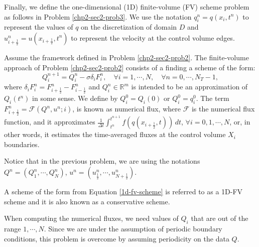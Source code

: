 Finally, we define the one-dimensional (1D) finite-volume (FV)
scheme problem as follows in Problem \ref{chp2-sec2-prob3}.
We use the notation ${q}^n_{i} = {q}(x_i, t^{n})$
to represent the values of ${q}$ on the discretization of domain $D$
and $u_{i+\frac{1}{2}}^n = u(x_{i+\frac{1}{2}},t^{n})$
to represent the velocity at the control volume edges.
\begin{prob}[1D-FV scheme]
	\label{chp2-sec2-prob3}
	Assume the framework defined in Problem \ref{chp2-sec2-prob2}.
	The finite-volume approach of Problem \ref{chp2-sec2-prob2}
	consists of a finding a scheme of the form:
        \begin{equation}
					\label{1d-fv-scheme}
		{Q}_{i}^{n+1} =  {Q}_{i}^{n} -
            \sigma \delta_i {F}_{i}^{n},
                \quad \forall i = 1, \cdots, N,
                \quad \forall n = 0, \cdots, N_T-1,
        \end{equation}
	where $\delta_i {F}_{i}^{n} = 
    {F}_{i+\frac{1}{2}}^{n} - {F}_{i-\frac{1}{2}}^{n}$
    and ${Q}_{i}^{n} \in \mathbb{R}^m$ is intended to be an approximation
	of ${Q}_i(t^{n})$ in some sense. We define by
    ${Q}_{i}^{0} = {Q}_i(0)$ or ${Q}_{i}^{0} = {q}^{0}_{i}$. 
	The term ${F}_{i+\frac{1}{2}}^{n} = \mathcal{F}
    (Q^{n}, u^n ;i)$, is known as numerical flux, where $\mathcal{F}$ 
    is the numerical flux function, and it approximates
	$\frac{1}{\Delta t}\int_{t^{n}}^{t^{n+1}} 
    {f}({q}(x_{i+\frac{1}{2}}, t)) \,dt $,
	$\forall i = 0, 1, \cdots, N$,
	or, in other words, it estimates the time-averaged fluxes at
    the control volume $X_i$ boundaries.
\end{prob}

\begin{remark}
Notice that in the previous problem, we are using the notations 
$Q^n = (Q_1^n, \cdots, Q_N^n)$, $u^n = (u_{\frac{1}{2}}^n, \cdots, u_{N+\frac{1}{2}}^n)$.
\end{remark}

\begin{remark}
	A scheme of the form from Equation \eqref{1d-fv-scheme} is referred to as a 1D-FV scheme and
	it is also known as a conservative scheme.
\end{remark}

\begin{remark}
	When computing the numerical fluxes, we need values of $Q_i$ that are out of the range $1,\cdots, N$.
	Since we are under the assumption of periodic boundary conditions, this problem
	is overcome by assuming periodicity on the data $Q$.
\end{remark}

